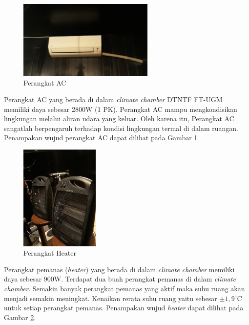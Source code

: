 \begin{figure}[!h]
	\centering
	\includegraphics[width=0.6\textwidth]{figures/AC}
	\caption{Perangkat AC}
	\label{fig:4:AC}
\end{figure}

Perangkat AC yang berada di dalam \textit{climate chamber} DTNTF FT-UGM memiliki daya sebesar 2800W (1 PK). Perangkat AC mampu mengkondisikan lingkungan melalui aliran udara yang keluar. Oleh karena itu, Perangkat AC sangatlah berpengaruh terhadap kondisi lingkungan termal di dalam ruangan. Penampakan wujud perangkat AC dapat dilihat pada Gambar \ref{fig:4:AC}

\begin{figure}[!h]
	\centering
	\includegraphics[width=0.35\textwidth]{figures/Heater}
	\caption{Perangkat Heater}
	\label{fig:4:Heater}
\end{figure}

Perangkat pemanas (\textit{heater}) yang berada di dalam \textit{climate chamber} memiliki daya sebesar 900W. Terdapat dua buah perangkat pemanas di dalam \textit{climate chamber}. Semakin banyak perangkat pemanas yang aktif maka suhu ruang akan menjadi semakin meningkat. Kenaikan rerata suhu ruang yaitu sebesar $\pm1,9^\circ$C untuk setiap perangkat pemanas. Penampakan wujud \textit{heater} dapat dilihat pada Gambar \ref{fig:4:Heater}.

